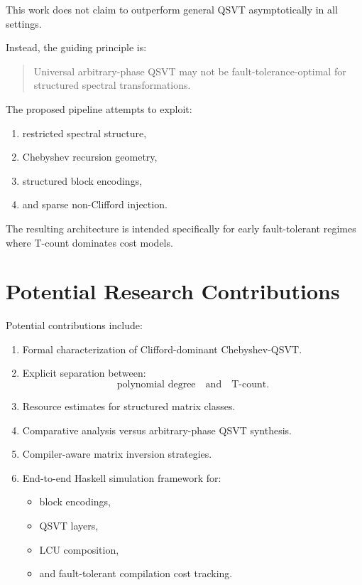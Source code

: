\documentclass[12pt,a4paper]{article}
\begin{document}
This work does not claim to outperform general QSVT asymptotically in all settings.

Instead, the guiding principle is:

\begin{quote}
Universal arbitrary-phase QSVT may not be fault-tolerance-optimal for structured spectral transformations.
\end{quote}

The proposed pipeline attempts to exploit:

\begin{enumerate}
    \item restricted spectral structure,
    \item Chebyshev recursion geometry,
    \item structured block encodings,
    \item and sparse non-Clifford injection.
\end{enumerate}

The resulting architecture is intended specifically for early fault-tolerant regimes where T-count dominates cost models.


\section{Potential Research Contributions}

Potential contributions include:

\begin{enumerate}
    \item Formal characterization of Clifford-dominant Chebyshev-QSVT.
    
    \item Explicit separation between:
    \[
    \text{polynomial degree}
    \quad\text{and}\quad
    \text{T-count}.
    \]
    
    \item Resource estimates for structured matrix classes.
    
    \item Comparative analysis versus arbitrary-phase QSVT synthesis.
    
    \item Compiler-aware matrix inversion strategies.
    
    \item End-to-end Haskell simulation framework for:
    \begin{itemize}
        \item block encodings,
        \item QSVT layers,
        \item LCU composition,
        \item and fault-tolerant compilation cost tracking.
    \end{itemize}
\end{enumerate}
\end{document}
